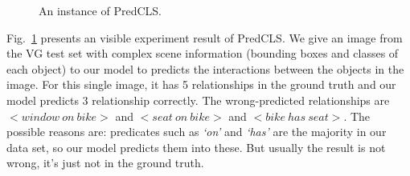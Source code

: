 \begin{figure}[H]
	\caption[An instance of PredCLS]{An instance of PredCLS.}
	\label{fig:predcls}
\end{figure}
Fig.~\ref{fig:predcls} presents an visible experiment result of PredCLS. We give an image from the VG test set with complex scene information (bounding boxes and classes of each object) to our  model to predicts the interactions between the objects in the image. For this single image, it has 5 relationships in the ground truth and our model predicts 3 relationship correctly. The wrong-predicted relationships are $ <window\ on\ bike >$ and $<seat\ on\ bike>$ and $<bike\ has\ seat>$. The possible reasons are: predicates such as \textit{`on' }and \textit{`has' } are the majority in our data set, so our model predicts them into these. But usually the result is not wrong, it's just not in the ground truth.

